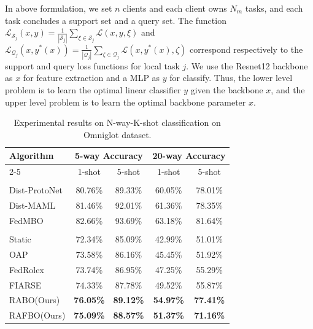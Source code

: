 \documentclass[lettersize,journal]{IEEEtran}
\begin{document}
In above formulation, we set $n$ clients and each client owns $N_m$ tasks, and each task concludes a support set and a query set. The function
$\mathcal{L}_{\mathcal{S}_j}(x, y)=\frac{1}{|\mathcal{S}_j|}\sum_{\xi\in\mathcal{S}_j}\mathcal{L}(x,y,\xi)$ and 
$\mathcal{L}_{\mathcal{Q}_j}(x, y^*(x))=\frac{1}{|\mathcal{Q}_j|}\sum_{\zeta\in\mathcal{Q}_j}\mathcal{L}(x,y^*(x),\zeta)$ correspond respectively to the support and query loss functions for local task $j$.
We use the Resnet12 backbone as $x$ for feature extraction and a MLP as $y$ for classify. Thus, the lower level problem is to learn the optimal linear classifier $y$ given the backbone $x$, and the upper level problem is to learn the optimal backbone parameter $x$.

\begin{table}[t]
    \centering
    \caption{Experimental results on N-way-K-shot classification on Omniglot dataset.}
    \label{tab:baselines}
    \begin{tabular}{lcccc} 
    \toprule
    \multirow{2}{*}{Algorithm} & \multicolumn{2}{c}{5-way Accuracy}& \multicolumn{2}{c}{20-way Accuracy}\\ 
    \cline{2-5}
    & 1-shot & 5-shot & 1-shot & 5-shot \\ 
    \midrule
    \rowcolor{mypurple} \multicolumn{5}{c}{\textit{\textcolor{gray}{Full model}}} \\
    Dist-ProtoNet & 80.76\% & 89.33\% & 60.05\% & 78.01\%\\
    Dist-MAML & 81.46\% & 92.01\% & 61.36\% & 78.35\%\\
    FedMBO\cite{conf/icml/fedmbo} & 82.66\% & 93.69\% & 63.18\% & 81.64\%\\
    \midrule
    \rowcolor{mypurple} \multicolumn{5}{c}{\textit{\textcolor{gray}{Sub model}}} \\
    Static & 72.34\% & 85.09\% & 42.99\% & 51.01\%\\
    OAP\cite{zhou2024every} & 73.58\% & 86.16\% & 45.45\% &51.92\%\\
    FedRolex\cite{alam2022fedrolex} & 73.74\% & 86.95\% & 47.25\% & 55.29\%\\
    FIARSE\cite{wu2024fiarse} & 74.33\% & 87.78\% & 49.52\% & 55.87\%\\
    \midrule
    \rowcolor{mypurple}RABO(Ours)& \textbf{76.05\%} & \textbf{89.12\%} & \textbf{54.97\%} & \textbf{77.41\%}\\ 
    \rowcolor{mypurple}RAFBO(Ours)& \textbf{75.09\% }& \textbf{88.57\%} & \textbf{51.37\%} & \textbf{71.16\%}\\
    \bottomrule
    \end{tabular}
\end{table}
\end{document}
